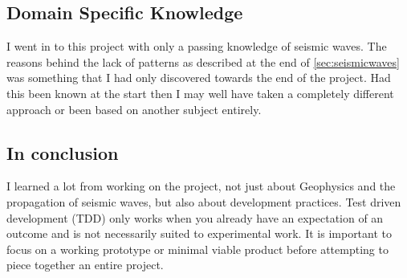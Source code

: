 \documentclass[../report.tex]{subfiles}
\begin{document}
\subsection{Domain Specific Knowledge}

	I went in to this project with only a passing knowledge of seismic waves.  The reasons behind the lack of patterns as described at the end of \cref{sec:seismicwaves} was something that I had only discovered towards the end of the project.  Had this been known at the start then I may well have taken a completely different approach or been based on another subject entirely.
	
\subsection{In conclusion}

	I learned a lot from working on the project, not just about Geophysics and the propagation of seismic waves, but also about development practices.  Test driven development (TDD) only works when you already have an expectation of an outcome and is not necessarily suited to experimental work.  It is important to focus on a working prototype or minimal viable product before attempting to piece together an entire project.
	
\end{document}
